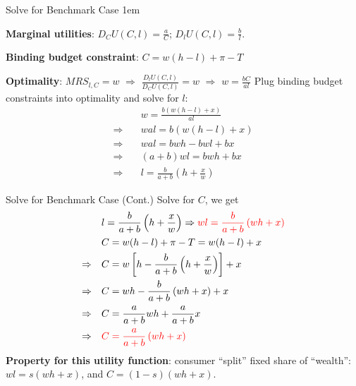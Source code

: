 \documentclass[11pt,aspectratio=43]{beamer}
\newcommand{\red}[1]{\textcolor{red}{#1}}
\let\olditemize=\itemize
\let\endolditemize=\enditemize
\renewenvironment{itemize}{\olditemize \itemsep1em}{\endolditemize}
\theoremstyle{definition}
\begin{document}
\begin{frame}{Solve for Benchmark Case}
\label{slide:Solve_for_Benchmark_Case}
\begin{itemize}
    \item \textbf{Marginal utilities}: $ D_{C} U( C, l ) = \frac{a}{C} $; $ D_{l} U( C, l ) = \frac{b}{l} $.
    \item \textbf{Binding budget constraint}: $ C = w( h-l ) + \pi - T $
    \item \textbf{Optimality}: $ MRS_{l, C} = w $ $ \Rightarrow  $ $ \frac{D_{l}U( C, l )}{D_{C}U( C, l )} = w $ $ \Rightarrow  $ $ w = \frac{bC}{al} $
\end{itemize}
Plug binding budget constraints into optimality and solve for $ l $:
%
\begin{align}
        & w = \frac{b ( w( h-l ) + x )}{al}
    \\
    \Rightarrow \quad
        & w a l = b( w( h-l ) + x )
    \\
    \Rightarrow \quad
        & w a l = bwh - bwl + bx
    \\
    \Rightarrow \quad
        & ( a+b ) wl = bwh + bx
    \\
    \Rightarrow \quad
        & l = \frac{b}{a+b} \left( h + \frac{x}{w} \right)
\end{align}
%
\end{frame}

\begin{frame}{Solve for Benchmark Case (Cont.)}
\label{slide:Solve_for_Benchmark_Case__Cont__}
    Solve for $ C $, we get
    \begin{align}
            & l = \frac{b}{a+b} \left( h + \frac{x}{w} \right) \Rightarrow \red{w l = \frac{b}{a+b} \left( w h + x \right)}
        \\
            & C = w( h-l ) + \pi - T = w( h-l ) + x
        \\
        \Rightarrow \quad
            & C = w \left[
                h - \frac{b}{ a+b}
                \left( h + \frac{x}{w} \right)
            \right] + x
        \\
        \Rightarrow \quad
            & C = wh - \frac{b}{a+b} \left(
                wh + x
            \right) + x
        \\
        \Rightarrow \quad
            & C = \frac{a}{a+b} wh + \frac{a}{a+b} x
        \\
        \Rightarrow \quad
            & \red{C = \frac{a}{a+b} \left( wh + x \right)}
    \end{align}
    \textbf{Property for this utility function}: consumer ``\alert{split}'' fixed share of ``\alert{wealth}'': $ wl = s( wh + x ) $, and $ C = ( 1-s ) ( wh + x ) $.
\end{frame}
\end{document}
